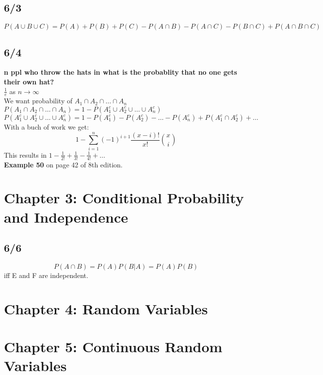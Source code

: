 \documentclass{article}
\begin{document}
\subsection*{6/3}
$P(A \cup B \cup C) = P(A) + P(B) + P(C) - P(A \cap B) - P(A \cap C) - P(B \cap C) + P(A \cap B \cap C)$\\

\subsection*{6/4}
\textbf{n ppl who throw the hats in what is the probablity that no one gets their own hat?}\\
$\frac{1}{e}$ as $n \to \infty$\\
We want probability of $A_1 \cap A_2 \cap \ldots \cap A_n$\\
$P(A_1 \cap A_2 \cap \ldots \cap A_n) = 1 - P(A_1^c \cup A_2^c \cup \ldots \cup A_n^c)$\\
$P(A_1^c \cup A_2^c \cup \ldots \cup A_n^c) = 1 - P(A_1^c) - P(A_2^c) - \ldots - P(A_n^c) + P(A_1^c \cap A_2^c) + \ldots$\\
With a buch of work we get:
$$ 1 - \sum_{i=1}^{n} (-1)^{i+1} \frac{(x-i)!}{x!}\binom{x}{i}$$
This results in $1 - \frac{1}{2!} + \frac{1}{3!} - \frac{1}{4!} + \ldots$\\

\textbf{Example 50} on page 42 of 8th edition.\\

\section{Chapter 3: Conditional Probability and Independence}
\subsection*{6/6}
$$P(A \cap B) = P(A)P(B|A) = P(A)P(B)$$
iff E and F are independent.\\
\section{Chapter 4: Random Variables}

\section{Chapter 5: Continuous Random Variables}
\end{document}
